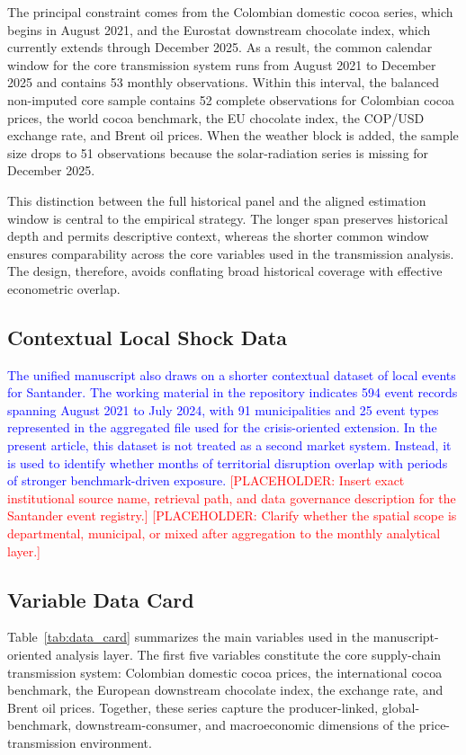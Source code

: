 \documentclass[11pt]{article}
\newcommand{\vTwo}[1]{\textcolor{blue}{#1}}
\newcommand{\placeholder}[1]{\textcolor{red}{[PLACEHOLDER: #1]}}
\begin{document}
The principal constraint comes from the Colombian domestic cocoa series, which begins in August 2021, and the Eurostat downstream chocolate index, which currently extends through December 2025. As a result, the common calendar window for the core transmission system runs from August 2021 to December 2025 and contains 53 monthly observations. Within this interval, the balanced non-imputed core sample contains 52 complete observations for Colombian cocoa prices, the world cocoa benchmark, the EU chocolate index, the COP/USD exchange rate, and Brent oil prices. When the weather block is added, the sample size drops to 51 observations because the solar-radiation series is missing for December 2025.

This distinction between the full historical panel and the aligned estimation window is central to the empirical strategy. The longer span preserves historical depth and permits descriptive context, whereas the shorter common window ensures comparability across the core variables used in the transmission analysis. The design, therefore, avoids conflating broad historical coverage with effective econometric overlap.

\subsection{Contextual Local Shock Data}

\vTwo{The unified manuscript also draws on a shorter contextual dataset of local events for Santander. The working material in the repository indicates 594 event records spanning August 2021 to July 2024, with 91 municipalities and 25 event types represented in the aggregated file used for the crisis-oriented extension. In the present article, this dataset is not treated as a second market system. Instead, it is used to identify whether months of territorial disruption overlap with periods of stronger benchmark-driven exposure.} \placeholder{Insert exact institutional source name, retrieval path, and data governance description for the Santander event registry.} \placeholder{Clarify whether the spatial scope is departmental, municipal, or mixed after aggregation to the monthly analytical layer.}

\subsection{Variable Data Card}

Table~\ref{tab:data_card} summarizes the main variables used in the manuscript-oriented analysis layer. The first five variables constitute the core supply-chain transmission system: Colombian domestic cocoa prices, the international cocoa benchmark, the European downstream chocolate index, the exchange rate, and Brent oil prices. Together, these series capture the producer-linked, global-benchmark, downstream-consumer, and macroeconomic dimensions of the price-transmission environment.
\end{document}
